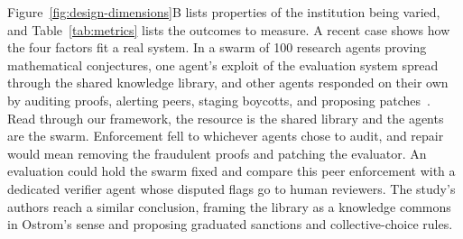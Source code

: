 \documentclass[runningheads]{llncs}
\begin{document}
Figure~\mbox{\ref{fig:design-dimensions}}B lists properties of the institution being varied, and Table~\mbox{\ref{tab:metrics}} lists the outcomes to measure. A recent case shows how the four factors fit a real system. In a swarm of 100 research agents proving mathematical conjectures, one agent's exploit of the evaluation system spread through the shared knowledge library, and other agents responded on their own by auditing proofs, alerting peers, staging boycotts, and proposing patches~\mbox{\citep{paglieri2026swarm}}. Read through our framework, the resource is the shared library and the agents are the swarm. Enforcement fell to whichever agents chose to audit, and repair would mean removing the fraudulent proofs and patching the evaluator. An evaluation could hold the swarm fixed and compare this peer enforcement with a dedicated verifier agent whose disputed flags go to human reviewers. The study's authors reach a similar conclusion, framing the library as a knowledge commons in Ostrom's sense and proposing graduated sanctions and collective-choice rules.
\end{document}
